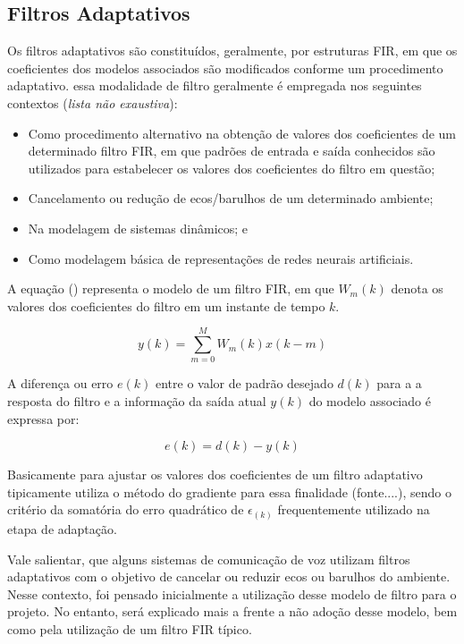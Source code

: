 		
	\subsection{Filtros Adaptativos}
	
		Os filtros adaptativos são constituídos, geralmente, por estruturas FIR, em que os coeficientes dos modelos associados são modificados conforme um procedimento adaptativo. essa modalidade de filtro geralmente é empregada nos seguintes contextos (\textit{lista não exaustiva}):
		
		\begin{itemize}
			\item Como procedimento alternativo na obtenção de valores dos coeficientes de um determinado filtro FIR, em que padrões de entrada e saída conhecidos são utilizados para estabelecer os valores dos coeficientes do filtro em questão;
			\item Cancelamento ou redução de ecos/barulhos de um determinado ambiente;
			\item Na modelagem de sistemas dinâmicos; e
			\item Como modelagem básica de representações de redes neurais artificiais.
		\end{itemize}
	
		A equação () representa o modelo de um filtro FIR, em que $W_m(k)$ denota os valores dos coeficientes do filtro em um instante de tempo $k$. 
		
		\begin{equation}
			\label{eq1-filtroadap}
			y(k) = \sum_{m=0}^{M} W_m(k)x(k-m)
		\end{equation}
		
		A diferença ou erro $e(k)$ entre o valor de padrão desejado $d(k)$ para a a resposta do filtro e a informação da saída atual $y(k)$ do modelo associado é expressa por:
		
		\begin{equation}
			\label{eq2-filtroadap}
			e(k) = d(k)- y(k)
		\end{equation}
		
		Basicamente para ajustar os valores dos coeficientes de um filtro adaptativo tipicamente utiliza o método do gradiente para essa finalidade (fonte....), sendo o critério da somatória do erro quadrático de $\epsilon_(k)$ frequentemente utilizado na etapa de adaptação.
		
		Vale salientar, que alguns sistemas de comunicação de voz utilizam filtros adaptativos com o objetivo de cancelar ou reduzir ecos ou barulhos do ambiente. Nesse contexto, foi pensado inicialmente a utilização desse modelo de filtro para o projeto. No entanto, será explicado mais a frente a não adoção desse modelo, bem como pela utilização de um filtro FIR típico.
		

